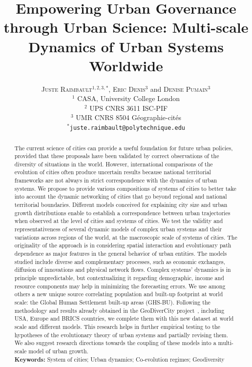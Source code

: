 \documentclass[11pt]{article}
\newcommand{\noun}[1]{\textsc{#1}}
\begin{document}
\title{Empowering Urban Governance through Urban Science: Multi-scale Dynamics of Urban Systems Worldwide}

\author{\noun{Juste Raimbault}$^{1,2,3,\ast}$, \noun{Eric Denis}$^3$ and \noun{Denise Pumain}$^3$\medskip\\
$^1$ CASA, University College London\\
$^2$ UPS CNRS 3611 ISC-PIF\\
$^3$ UMR CNRS 8504 G{\'e}ographie-cit{\'e}s\medskip\\
$^{\ast}$\texttt{juste.raimbault@polytechnique.edu}
}
\date{}

\maketitle

\justify

\begin{abstract}
The current science of cities can provide a useful foundation for future urban policies, provided that these proposals have been validated by correct observations of the diversity of situations in the world. However, international comparisons of the evolution of cities often produce uncertain results because national territorial frameworks are not always in strict correspondence with the dynamics of urban systems. We propose to provide various compositions of systems of cities to better take into account the dynamic networking of cities that go beyond regional and national territorial boundaries. Different models conceived for explaining city size and urban growth distributions enable to establish a correspondence between urban trajectories when observed at the level of cities and systems of cities. We test the validity and representativeness of several dynamic models of complex urban systems and their variations across regions of the world, at the macroscopic scale of systems of cities. The originality of the approach is in considering spatial interaction and evolutionary path dependence as major features in the general behavior of urban entities. The models studied include diverse and complementary processes, such as economic exchanges, diffusion of innovations and physical network flows. Complex systems' dynamics is in principle unpredictable, but contextualizing it regarding demographic, income and resource components may help in minimizing the forecasting errors. We use among others a new unique source correlating population and built-up footprint at world scale: the Global Human Settlement built-up areas (GHS-BU). Following the methodology and results already obtained in the GeoDiverCity project~\cite{pumain2015multilevel,cura2017old,pumain2017urban}, including USA, Europe and BRICS countries, we complete them with this new dataset at world scale and different models. This research helps in further empirical testing to the hypotheses of the evolutionary theory of urban systems and partially revising them. We also suggest research directions towards the coupling of these models into a multi-scale model of urban growth.\medskip\\
	\textbf{Keywords: } System of cities; Urban dynamics; Co-evolution regimes; Geodiversity
\end{abstract}
\end{document}
